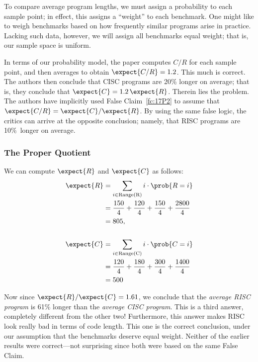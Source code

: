 To compare average program lengths, we must assign a probability to
each sample point; in effect, this assigns a ``weight'' to each
benchmark.  One might like to weigh benchmarks based on how frequently
similar programs arise in practice.  Lacking such data, however, we
will assign all benchmarks equal weight; that is, our sample space is
uniform.

In terms of our probability model, the paper computes $C / R$ for each
sample point, and then averages to obtain $\expect{C / R} = 1.2$.
This much is correct.  The authors then conclude that CISC programs
are 20\% longer on average; that is, they conclude that $\expect{C} =
1.2\, \expect{R}$.  Therein lies the problem.  The authors have
implicitly used False Claim~\ref{fc:17P2} to assume that $\expect{C/R}
= \expect{C}/\expect{R}$.  By using the same false logic, the critics
can arrive at the opposite conclusion; namely, that RISC programs are
10\%~longer on average.


\subsubsection{The Proper Quotient}

We can compute $\expect{R}$ and $\expect{C}$ as follows:
\begin{align*}
\expect{R}  
    & = \sum_{i \in \text{Range(R)}} i \cdot \prob{R = i} \\
    & = \frac{150}{4}+\frac{120}{4}+\frac{150}{4}+\frac{2800}{4} \\
    & = 805, \\
\\
\expect{C}
    & = \sum_{i \in \text{Range(C)}} i \cdot \prob{C = i} \\
    & = \frac{120}{4}+\frac{180}{4}+\frac{300}{4}+\frac{1400}{4} \\
    & = 500
\end{align*}

Now since $\expect{R}/\expect{C} = 1.61$, we conclude that the
\emph{average RISC program} is 61\% longer than the \emph{average CISC
  program}.  This is a third answer, completely different from the
other two!  Furthermore, this answer makes RISC look really bad in
terms of code length.  This one is the correct conclusion, under our
assumption that the benchmarks deserve equal weight.  Neither of the
earlier results were correct---not surprising since both were based on
the same False Claim.

